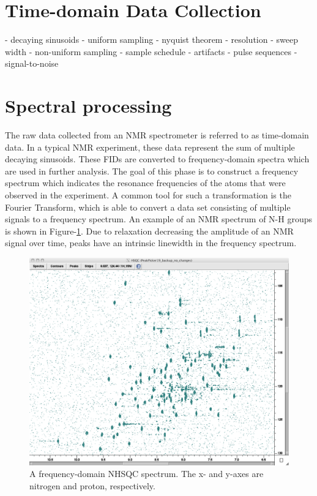 \section{Time-domain Data Collection}
 - decaying sinusoids
 - uniform sampling
 - nyquist theorem
 - resolution
 - sweep width
 - non-uniform sampling
   - sample schedule
 - artifacts
 - pulse sequences
 - signal-to-noise


\section{Spectral processing}

The raw data collected from an NMR spectrometer is referred to as 
time-domain data.  In a typical NMR experiment, these data represent the 
sum of multiple decaying sinusoids.  These FIDs are converted to 
frequency-domain spectra which are used in further analysis.  The goal of 
this phase is to construct a frequency spectrum which indicates the resonance 
frequencies of the atoms that were observed in the experiment.  A common tool 
for such a transformation is the Fourier Transform, which is able to convert 
a data set consisting of multiple signals to a frequency spectrum.  
An example of an NMR spectrum of N-H groups is shown in Figure-\ref{nhsqc}.
Due to relaxation decreasing the amplitude of an NMR signal over time, peaks 
have an intrinsic linewidth in the frequency spectrum.

\begin{figure}
  \includegraphics[scale=0.35]{figures/nhsqc}
  \caption[A frequency-domain NHSQC spectrum]
          {A frequency-domain NHSQC spectrum. 
           The x- and y-axes are nitrogen and proton, respectively.}
  \label{nhsqc}
\end{figure}

